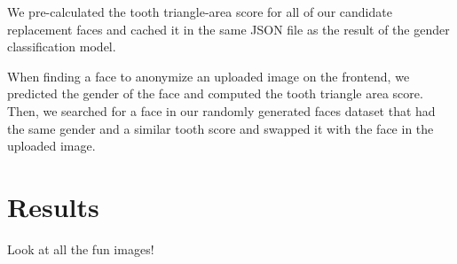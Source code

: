We pre-calculated the tooth triangle-area score for all of our candidate replacement faces and cached it in the same JSON file as the result of the gender classification model.

When finding a face to anonymize an uploaded image on the frontend, we predicted the gender of the face and computed the tooth triangle area score. Then, we searched for a face in our randomly generated faces dataset that had the same gender and a similar tooth score and swapped it with the face in the uploaded image.

\section{Results}

Look at all the fun images!







